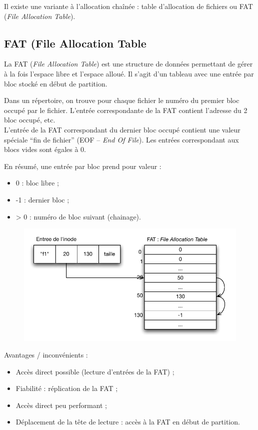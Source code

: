 \documentclass[11pt,english,french]{scrreprt}
\theoremstyle{remark}
\theoremstyle{definition}
\newcommand*\Pitem{%
  \item[\color{green}\scalebox{0.9}{\textbullet}]}
\newcommand*\Citem{%
  \item[\color{red}\scalebox{0.9}{\textbullet}]}
\begin{document}
Il existe une variante à l'allocation chaînée : table d'allocation de fichiers ou FAT (\emph{File Allocation Table}).

\subsection{FAT (File Allocation Table}

La FAT (\emph{File Allocation Table}) est une structure de données permettant de gérer à la fois l'espace libre et l'espace alloué. Il s'agit d'un tableau avec une entrée par bloc stocké en début de partition.

Dans un répertoire, on trouve pour chaque fichier le numéro du premier bloc occupé par le fichier. L'entrée correspondante de la FAT contient l'adresse du 2 bloc occupé, etc.\\
L'entrée de la FAT correspondant du dernier bloc occupé contient une valeur spéciale ``fin de fichier'' (EOF -- \emph{End Of File}). Les entrées correspondant aux blocs vides sont égales à 0.

En résumé, une entrée par bloc prend pour valeur :
\begin{itemize}
	\item 0 : bloc libre ;
	\item -1 : dernier bloc ;
	\item > 0 : numéro de bloc suivant (chainage).
\end{itemize}

\begin{figure}[h!]
	\center
	\vspace{-15pt}
	\includegraphics[scale=.85]{img/FAT}
	\vspace{-15pt}
\end{figure}

Avantages / inconvénients :
\begin{itemize}
	\Pitem Accès direct possible (lecture d'entrées de la FAT) ;
	\Pitem Fiabilité : réplication de la FAT ;
	\Citem Accès direct peu performant ;
	\Citem Déplacement de la tête de lecture : accès à la FAT en début de partition.
\end{itemize}
\end{document}
